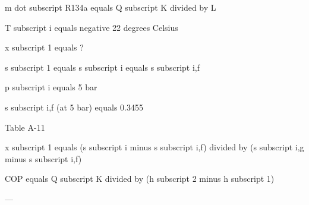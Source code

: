 m dot subscript R134a equals Q subscript K divided by L  

T subscript i equals negative 22 degrees Celsius  

x subscript 1 equals ?  

s subscript 1 equals s subscript i equals s subscript i,f  

p subscript i equals 5 bar  

s subscript i,f (at 5 bar) equals 0.3455  

Table A-11  

x subscript 1 equals (s subscript i minus s subscript i,f) divided by (s subscript i,g minus s subscript i,f)  

COP equals Q subscript K divided by (h subscript 2 minus h subscript 1)  

---